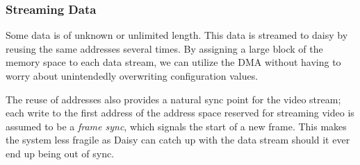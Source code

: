 \subsubsection{Streaming Data}
Some data is of unknown or unlimited length. This data is streamed to daisy by reusing the same addresses several times.
By assigning a large block of the memory space to each data stream, we can utilize the DMA without having to worry about unintendedly overwriting configuration values.

The reuse of addresses also provides a natural sync point for the video stream;
each write to the first address of the address space reserved for streaming video is assumed to be a \textit{frame sync}, which signals the start of a new frame.
This makes the system less fragile as Daisy can catch up with the data stream should it ever end up being out of sync.
